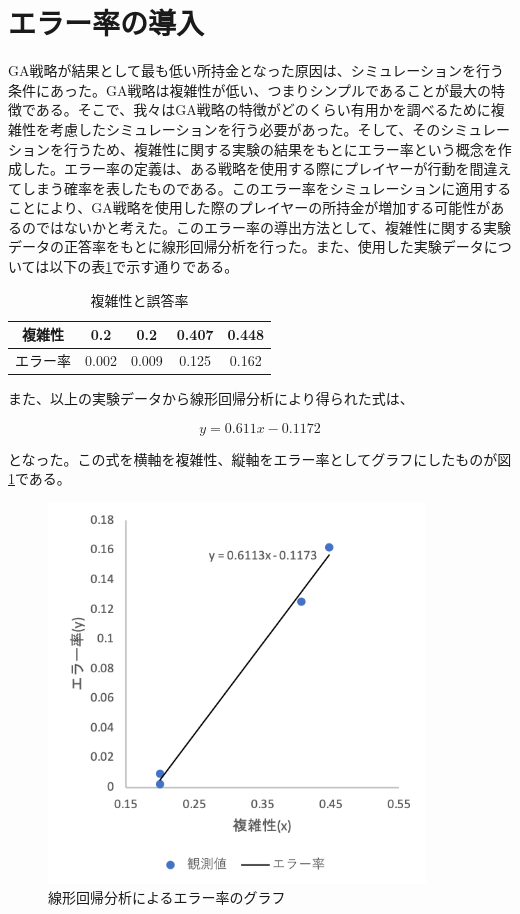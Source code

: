 \section{エラー率の導入}
GA戦略が結果として最も低い所持金となった原因は、シミュレーションを行う条件にあった。GA戦略は複雑性が低い、つまりシンプルであることが最大の特徴である。そこで、我々はGA戦略の特徴がどのくらい有用かを調べるために複雑性を考慮したシミュレーションを行う必要があった。そして、そのシミュレーションを行うため、複雑性に関する実験の結果をもとにエラー率という概念を作成した。エラー率の定義は、ある戦略を使用する際にプレイヤーが行動を間違えてしまう確率を表したものである。このエラー率をシミュレーションに適用することにより、GA戦略を使用した際のプレイヤーの所持金が増加する可能性があるのではないかと考えた。このエラー率の導出方法として、複雑性に関する実験データの正答率をもとに線形回帰分析を行った。また、使用した実験データについては以下の表\ref{hoge}で示す通りである。

  \begin{table}[H]
    \centering
    \caption{複雑性と誤答率}
    \begin{tabular}{|c|c|c|c|c|} \hline
      複雑性&0.2&0.2&0.407&0.448 \\ \hline
      エラー率&0.002&0.009&0.125&0.162 \\ \hline
    \end{tabular}
    \label{hoge}
  \end{table}
また、以上の実験データから線形回帰分析により得られた式は、

  \begin{equation}
    y=0.611x - 0.1172
  \end{equation}

となった。この式を横軸を複雑性、縦軸をエラー率としてグラフにしたものが図\ref{hoge2}である。

  \begin{figure}[H]
    \label{hoge2}
    \begin{center}
      \includegraphics[width=10cm]{figure/betsimulation-error_rate.png}
      \caption{線形回帰分析によるエラー率のグラフ}
    \end{center}
  \end{figure}


